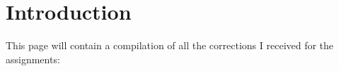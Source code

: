 \documentclass[11pt]{article}
\begin{document}
\maketitle

\section{Introduction}
This page will contain a compilation of all the corrections I received for the assignments:
\end{document}
